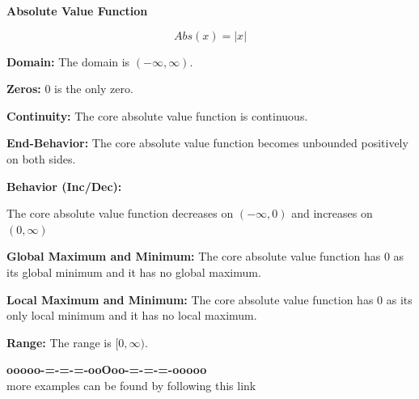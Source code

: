 \documentclass{ximera}
\begin{document}
\begin{explanation} \textbf{\textcolor{red!75!green}{Absolute Value Function}} 


\[ Abs(x) = |x|  \]



\textbf{Domain:} The domain is $(-\infty, \infty)$.

\textbf{Zeros:} $0$ is the only zero.




\textbf{Continuity:} The core absolute value function is continuous.

\textbf{End-Behavior:} The core absolute value function becomes unbounded positively on both sides.






\textbf{Behavior (Inc/Dec):} 

The core absolute value function decreases on $(-\infty, 0)$ and increases on $(0, \infty)$







\textbf{Global Maximum and Minimum:} The core absolute value function has $0$ as its global minimum and it has no global maximum.




\textbf{Local Maximum and Minimum:}  The core absolute value function has $0$ as its only local minimum and it has no local maximum.



\textbf{Range:} The range is $[0, \infty)$.

\end{explanation}







































\begin{onlineOnly}
\begin{center}
\textbf{\textcolor{green!50!black}{ooooo-=-=-=-ooOoo-=-=-=-ooooo}} \\

more examples can be found by following this link\\ 

\end{center}
\end{onlineOnly}
\end{document}
